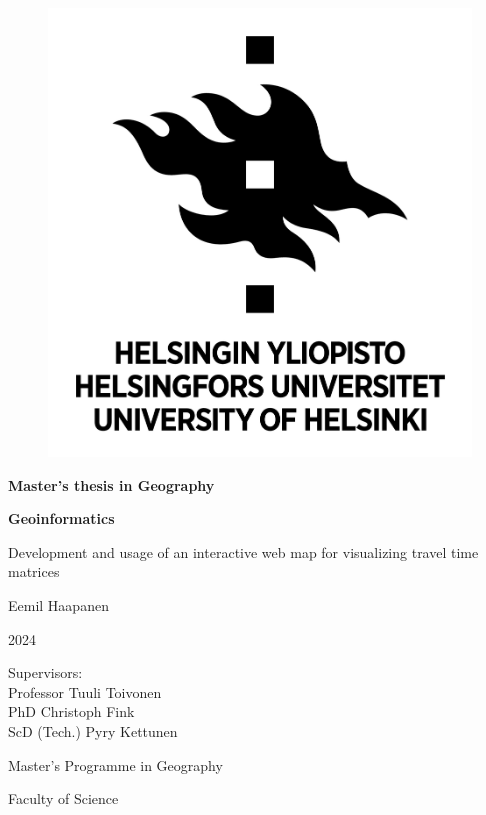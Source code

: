 \begin{titlepage}{
    \centering
    
    \begin{figure}[H]
        \centering
        \includegraphics[scale=0.4]{visual/other/helsinki_uni_logo.jpg}
    \end{figure}
    
    \bigskip
    \bigskip
    \bigskip
    \textbf{Master's thesis in Geography} \par
    \textbf{Geoinformatics} \par
    
    \bigskip
    \bigskip
    Development and usage of an interactive web map for visualizing travel time matrices
    
    \bigskip
    \bigskip
    Eemil Haapanen
    
    2024
    
    \vfill
    
    Supervisors: \\
    Professor Tuuli Toivonen \\
    PhD Christoph Fink \\
    ScD (Tech.) Pyry Kettunen \par
    \bigskip
    \bigskip
    \bigskip
    Master's Programme in Geography \par
    Faculty of Science \par
}
\end{titlepage}
